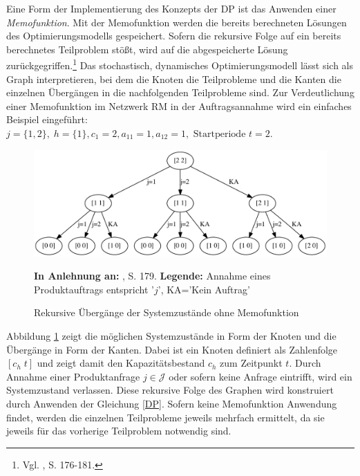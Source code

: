 Eine Form der Implementierung des Konzepts der DP ist das Anwenden einer \textit{Memofunktion}. Mit der Memofunktion werden die bereits berechneten Lösungen des Optimierungsmodells gespeichert. Sofern die rekursive Folge auf ein bereits berechnetes Teilproblem stößt, wird auf die abgespeicherte Lösung zurückgegriffen.\footnote{Vgl. \cite{hetland2010python}, S. 176-181.} Das stochastisch, dynamisches Optimierungsmodell lässt sich als Graph interpretieren, bei dem die Knoten die Teilprobleme und die Kanten die einzelnen Übergängen in die nachfolgenden Teilprobleme sind. Zur Verdeutlichung einer Memofunktion im Netzwerk RM in der Auftragsannahme wird ein einfaches Beispiel eingeführt: $j = \{1, 2\}, \; h = \{1\}, c_{1}=2, a_{11}=1, a_{12}=1, \text{ Startperiode } t=2.$

\begin{figure}[h!]
  \begin{center}
    \includegraphics[width=140mm]{Bilder/Einfach.pdf}
    \caption{Rekursive Übergänge der Systemzustände ohne Memofunktion}  \label{Einfach}
        {\footnotesize \textbf{In Anlehnung an:} \cite{hetland2010python}, S. 179.} 
    {\footnotesize \textbf{Legende:} Annahme eines Produktauftrags entspricht '$j$', KA='Kein Auftrag'} 
  \end{center}
\end{figure}

Abbildung \ref{Einfach} zeigt die möglichen Systemzustände in Form der Knoten und die Übergänge in Form der Kanten. Dabei ist ein Knoten definiert als Zahlenfolge $[c_h\; t]$ und zeigt damit den Kapazitätsbestand $c_h$ zum Zeitpunkt $t$. Durch Annahme einer Produktanfrage $j\in\mathcal{J}$ oder sofern keine Anfrage eintrifft, wird ein Systemzustand verlassen. Diese rekursive Folge des Graphen wird konstruiert durch Anwenden der Gleichung \eqref{DP}. Sofern keine Memofunktion Anwendung findet, werden die einzelnen Teilprobleme jeweils mehrfach ermittelt, da sie jeweils für das vorherige Teilproblem notwendig sind.

